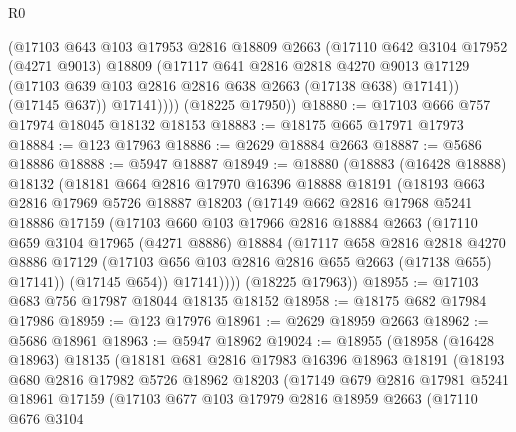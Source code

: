 \begin{lexlean}{R0}
\begin{coremodule}
            (@17103
              @643
              @103
              @17953
              @2816
              @18809
              @2663
              (@17110
                @642
                @3104
                @17952
                (@4271 @9013)
                @18809
                (@17117
                  @641
                  @2816
                  @2818
                  @4270
                  @9013
                  @17129
                  (@17103 @639 @103 @2816 @2816 @638 @2663 (@17138 @638) @17141))
                (@17145 @637))
              @17141))))
      (@18225 @17950))
@18880 := @17103 @666 @757 @17974 @18045 @18132 @18153
@18883 := @18175 @665 @17971 @17973
@18884 := @123 @17963
@18886 := @2629 @18884 @2663
@18887 := @5686 @18886
@18888 := @5947 @18887
@18949 := @18880
    (@18883
      (@16428 @18888)
      @18132
      (@18181
        @664
        @2816
        @17970
        @16396
        @18888
        @18191
        (@18193
          @663
          @2816
          @17969
          @5726
          @18887
          @18203
          (@17149
            @662
            @2816
            @17968
            @5241
            @18886
            @17159
            (@17103
              @660
              @103
              @17966
              @2816
              @18884
              @2663
              (@17110
                @659
                @3104
                @17965
                (@4271 @8886)
                @18884
                (@17117
                  @658
                  @2816
                  @2818
                  @4270
                  @8886
                  @17129
                  (@17103 @656 @103 @2816 @2816 @655 @2663 (@17138 @655) @17141))
                (@17145 @654))
              @17141))))
      (@18225 @17963))
@18955 := @17103 @683 @756 @17987 @18044 @18135 @18152
@18958 := @18175 @682 @17984 @17986
@18959 := @123 @17976
@18961 := @2629 @18959 @2663
@18962 := @5686 @18961
@18963 := @5947 @18962
@19024 := @18955
    (@18958
      (@16428 @18963)
      @18135
      (@18181
        @681
        @2816
        @17983
        @16396
        @18963
        @18191
        (@18193
          @680
          @2816
          @17982
          @5726
          @18962
          @18203
          (@17149
            @679
            @2816
            @17981
            @5241
            @18961
            @17159
            (@17103
              @677
              @103
              @17979
              @2816
              @18959
              @2663
              (@17110
                @676
                @3104

\end{coremodule}
\end{lexlean}
